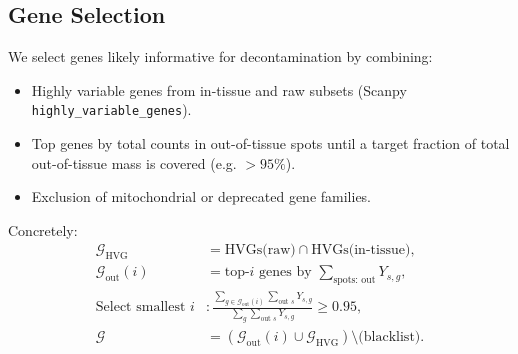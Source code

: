 \documentclass[11pt]{article}
\begin{document}
\subsection{Gene Selection}
We select genes likely informative for decontamination by combining:
\begin{itemize}
  \item Highly variable genes from in-tissue and raw subsets (Scanpy \texttt{highly\_variable\_genes}).
  \item Top genes by total counts in out-of-tissue spots until a target fraction of total out-of-tissue mass is covered (e.g. $>95\%$).
  \item Exclusion of mitochondrial or deprecated gene families.
\end{itemize}
Concretely:
\begin{align*}
\mathcal{G}_{\text{HVG}} &= \text{HVGs(raw)} \cap \text{HVGs(in-tissue)},\\
\mathcal{G}_{\text{out}}(i) &= \text{top-}i\text{ genes by } \sum_{\text{spots: out}} Y_{s,g},\\
\text{Select smallest } i &: \frac{\sum_{g\in \mathcal{G}_{\text{out}}(i)} \sum_{\text{out }s} Y_{s,g}}{\sum_g \sum_{\text{out }s} Y_{s,g}} \ge 0.95,\\
\mathcal{G} &= \left(\mathcal{G}_{\text{out}}(i) \cup \mathcal{G}_{\text{HVG}}\right)\setminus \text{(blacklist)}.
\end{align*}
\end{document}
